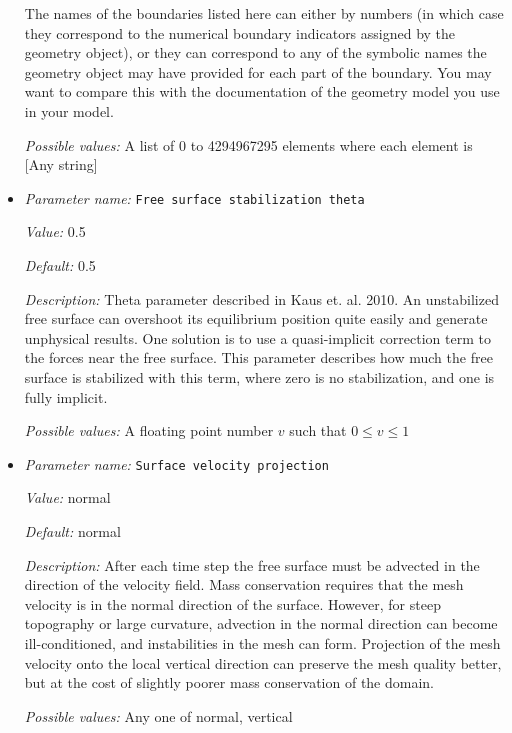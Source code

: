 \begin{itemize}
The names of the boundaries listed here can either by numbers (in which case they correspond to the numerical boundary indicators assigned by the geometry object), or they can correspond to any of the symbolic names the geometry object may have provided for each part of the boundary. You may want to compare this with the documentation of the geometry model you use in your model.


{\it Possible values:} A list of 0 to 4294967295 elements where each element is [Any string]
\item {\it Parameter name:} {\tt Free surface stabilization theta}
\label{parameters:Free surface/Free surface stabilization theta}
\label{parameters:Free_20surface/Free_20surface_20stabilization_20theta}


{\it Value:} 0.5


{\it Default:} 0.5


{\it Description:} Theta parameter described in Kaus et. al. 2010. An unstabilized free surface can overshoot its equilibrium position quite easily and generate unphysical results.  One solution is to use a quasi-implicit correction term to the forces near the free surface.  This parameter describes how much the free surface is stabilized with this term, where zero is no stabilization, and one is fully implicit.


{\it Possible values:} A floating point number $v$ such that $0 \leq v \leq 1$
\item {\it Parameter name:} {\tt Surface velocity projection}
\label{parameters:Free surface/Surface velocity projection}
\label{parameters:Free_20surface/Surface_20velocity_20projection}


{\it Value:} normal


{\it Default:} normal


{\it Description:} After each time step the free surface must be advected in the direction of the velocity field. Mass conservation requires that the mesh velocity is in the normal direction of the surface. However, for steep topography or large curvature, advection in the normal direction can become ill-conditioned, and instabilities in the mesh can form. Projection of the mesh velocity onto the local vertical direction can preserve the mesh quality better, but at the cost of slightly poorer mass conservation of the domain.


{\it Possible values:} Any one of normal, vertical
\end{itemize}

